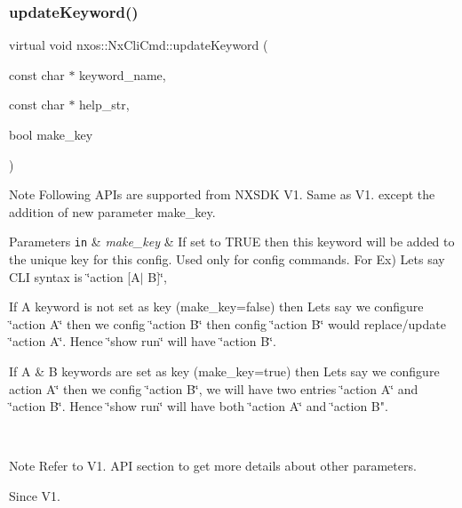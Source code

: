 \subsubsection{\texorpdfstring{update\+Keyword()}{updateKeyword()}\hspace{0.1cm}{\footnotesize\ttfamily [2/2]}}
{\footnotesize\ttfamily virtual void nxos\+::\+Nx\+Cli\+Cmd\+::update\+Keyword (\begin{DoxyParamCaption}\item[{const char $\ast$}]{keyword\+\_\+name,  }\item[{const char $\ast$}]{help\+\_\+str,  }\item[{bool}]{make\+\_\+key }\end{DoxyParamCaption})\hspace{0.3cm}{\ttfamily [pure virtual]}}

\begin{DoxyNote}{Note}
Following A\+P\+Is are supported from N\+X\+S\+DK V1. Same as V1. except the addition of new parameter make\+\_\+key.
\end{DoxyNote}

\begin{DoxyParams}[1]{Parameters}
\mbox{\tt in}  & {\em make\+\_\+key} & If set to T\+R\+UE then this keyword will be added to the unique key for this config. Used only for config commands. For Ex) Lets say C\+LI syntax is \char`\"{}action \mbox{[}\+A$\vert$ B\mbox{]}\char`\"{},
\begin{DoxyItemize}
\item If A keyword is not set as key (make\+\_\+key=false) then Lets say we configure \char`\"{}action A\char`\"{} then we config \char`\"{}action B\char`\"{} then config \char`\"{}action B\char`\"{} would replace/update \char`\"{}action A\char`\"{}. Hence \char`\"{}show run\char`\"{} will have \char`\"{}action B\char`\"{}.
\item If A \& B keywords are set as key (make\+\_\+key=true) then Lets say we configure action A\char`\"{} then we config \char`\"{}action B\char`\"{}, we will
                    have two entries \char`\"{}action A\char`\"{} and \char`\"{}action B\char`\"{}. Hence \char`\"{}show run\char`\"{}
                    will have both \char`\"{}action A\char`\"{} and \char`\"{}action B".
\end{DoxyItemize}\\
\hline
\end{DoxyParams}
\begin{DoxyNote}{Note}
Refer to V1. A\+PI section to get more details about other parameters.
\end{DoxyNote}
\begin{DoxySince}{Since}
V1. 
\end{DoxySince}
\mbox{\label{classnxos_1_1_nx_cli_cmd_abc9244b0bcf22142b5d784c06a6aa91b}} 
